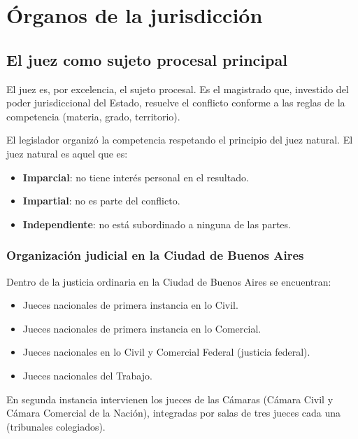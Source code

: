 \documentclass[12pt,oneside]{book}
\begin{document}
\chapter{Órganos de la jurisdicción}

\section{El juez como sujeto procesal principal}

El juez es, por excelencia, el sujeto procesal. Es el magistrado que, investido del poder jurisdiccional del Estado, resuelve el conflicto conforme a las reglas de la competencia (materia, grado, territorio).

El legislador organizó la competencia respetando el principio del juez natural. El juez natural es aquel que es:

\begin{itemize}
    \item \textbf{Imparcial}: no tiene interés personal en el resultado.
    \item \textbf{Impartial}: no es parte del conflicto.
    \item \textbf{Independiente}: no está subordinado a ninguna de las partes.
\end{itemize}

\subsection{Organización judicial en la Ciudad de Buenos Aires}

Dentro de la justicia ordinaria en la Ciudad de Buenos Aires se encuentran:

\begin{itemize}
    \item Jueces nacionales de primera instancia en lo Civil.
    \item Jueces nacionales de primera instancia en lo Comercial.
    \item Jueces nacionales en lo Civil y Comercial Federal (justicia federal).
    \item Jueces nacionales del Trabajo.
\end{itemize}

En segunda instancia intervienen los jueces de las Cámaras (Cámara Civil y Cámara Comercial de la Nación), integradas por salas de tres jueces cada una (tribunales colegiados).
\end{document}
